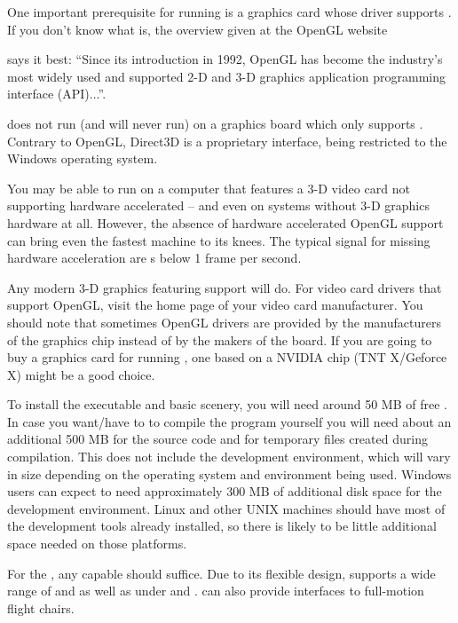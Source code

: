 One important prerequisite for running \FlightGear{} is a graphics card whose driver supports
. If you don't know what  is, the overview given at the OpenGL website
\medskip

\medskip

\noindent
 says it best: ``Since its introduction in 1992, OpenGL has become the
industry's most widely used and supported 2-D and 3-D graphics application programming
interface (API)...''.

\FlightGear{} does not run (and will never run) on a graphics board which only supports
. Contrary to OpenGL, Direct3D is a proprietary interface, being restricted to
the Windows operating system.

You may be able to run \FlightGear{} on a computer that features a 3-D video card not
supporting hardware accelerated  -- and even on systems without 3-D
graphics hardware at all. However, the absence of hardware accelerated OpenGL support can bring even
the fastest machine to its knees. The typical signal for missing hardware acceleration
are s below 1 frame per second.

Any modern 3-D graphics featuring  support will do. For
 video card drivers that support OpenGL, visit the home page of your video
card manufacturer. You should note that sometimes OpenGL drivers
are provided by the manufacturers of the graphics chip instead of by the makers of the
board. If you are going to buy a graphics card for running \FlightGear{}, one based on a
NVIDIA chip (TNT X/Geforce X) might be a good choice.

To install the executable and basic scenery, you will need around 50 MB of free . In case you want/have to to compile the program yourself you will need about an additional
500 MB for the source code and for temporary files created during compilation. This does not
include the development environment, which will vary in size depending on the operating system
and environment being used.  Windows users can expect to need approximately 300 MB of additional
disk space for the development environment.  Linux and other UNIX machines should have most of
the development tools already installed, so there is likely to be little additional space
needed on those platforms.

For the , any capable  should suffice.
Due to its flexible design, \FlightGear{} supports a wide range of  and
 as well as  under  and . 
\FlightGear{} can also provide interfaces to full-motion flight chairs.

